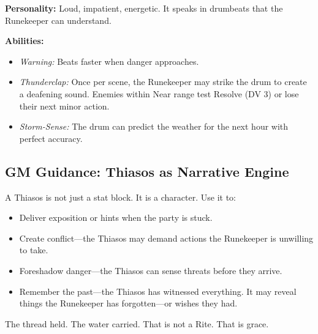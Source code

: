 \textbf{Personality:} Loud, impatient, energetic. It speaks in drumbeats that the Runekeeper can understand.

\textbf{Abilities:}
\begin{itemize}
\item \textit{Warning:} Beats faster when danger approaches.
\item \textit{Thunderclap:} Once per scene, the Runekeeper may strike the drum to create a deafening sound. Enemies within Near range test Resolve (DV 3) or lose their next minor action.
\item \textit{Storm-Sense:} The drum can predict the weather for the next hour with perfect accuracy.
\end{itemize}

\subsection{GM Guidance: Thiasos as Narrative Engine}

A Thiasos is not just a stat block. It is a character. Use it to:

\begin{itemize}
\item Deliver exposition or hints when the party is stuck.
\item Create conflict—the Thiasos may demand actions the Runekeeper is unwilling to take.
\item Foreshadow danger—the Thiasos can sense threats before they arrive.
\item Remember the past—the Thiasos has witnessed everything. It may reveal things the Runekeeper has forgotten—or wishes they had.
\end{itemize}

The thread held. The water carried. That is not a Rite. That is grace.
